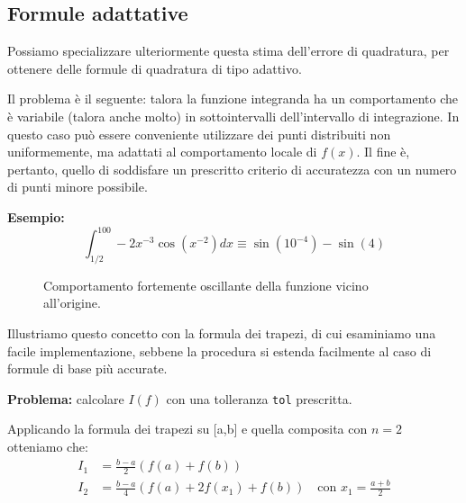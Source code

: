 \subsection{Formule adattative}

Possiamo specializzare ulteriormente questa stima dell'errore di quadratura, per ottenere delle formule di quadratura di tipo adattivo.

Il problema è il seguente: talora la funzione integranda ha un comportamento che è variabile (talora anche molto) in sottointervalli dell'intervallo di integrazione. In questo caso può essere conveniente utilizzare dei punti distribuiti non uniformemente, ma adattati al comportamento locale di $f(x)$. Il fine è, pertanto, quello di soddisfare un prescritto criterio di accuratezza con un numero di punti minore possibile.

\textbf{Esempio:}
\begin{equation}
\int_{1/2}^{100} -2x^{-3}\cos(x^{-2})dx \equiv \sin(10^{-4}) - \sin(4)
\end{equation}

\begin{figure}[htbp]
    \centering
    \caption{Comportamento fortemente oscillante della funzione vicino all'origine.}
\end{figure}

Illustriamo questo concetto con la formula dei trapezi, di cui esaminiamo una facile implementazione, sebbene la procedura si estenda facilmente al caso di formule di base più accurate.

\textbf{Problema:} calcolare $I(f)$ con una tolleranza \texttt{tol} prescritta.

Applicando la formula dei trapezi su [a,b] e quella composita con $n=2$ otteniamo che:
\begin{align*}
I_1 &= \frac{b-a}{2}(f(a) + f(b)) \\
I_2 &= \frac{b-a}{4}(f(a) + 2f(x_1) + f(b)) \quad \text{con } x_1 = \frac{a+b}{2}
\end{align*}

